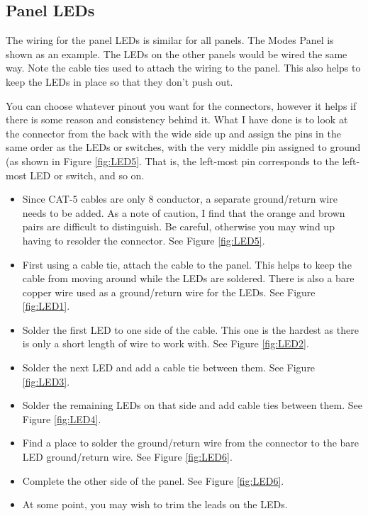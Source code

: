 \documentclass[10pt, openany]{book}
\begin{document}
\clearpage
\subsection{Panel LEDs}
\label{subsec:PanelLED}
The wiring for the panel LEDs is similar for all panels.  The Modes Panel is shown as an example.  The LEDs on the other panels would be wired the same way.  Note the cable ties used to attach the wiring to the panel.  This also helps to keep the LEDs in place so that they don't push out.

You can choose whatever pinout you want for the connectors, however it helps if there is some reason and consistency behind it.  What I have done is to look at the connector from the back with the wide side up and assign the pins in the same order as the LEDs or switches, with the very middle pin assigned to ground (as shown in Figure \ref{fig:LED5}.  That is, the left-most pin corresponds to the left-most LED or switch, and so on.

\begin{itemize}
  \item Since CAT-5 cables are only 8 conductor, a separate ground/return wire needs to be added.  As a note of caution, I find that the orange and brown pairs are difficult to distinguish.  Be careful, otherwise you may wind up having to resolder the connector.  See Figure \ref{fig:LED5}.
  \item First using a cable tie, attach the cable to the panel.  This helps to keep the cable from moving around while the LEDs are soldered.  There is also a bare copper wire used as a ground/return wire for the LEDs.  See Figure \ref{fig:LED1}.
  \item Solder the first LED to one side of the cable.  This one is the hardest as there is only a short length of wire to work with.  See Figure \ref{fig:LED2}.
  \item Solder the next LED and add a cable tie between them.  See Figure \ref{fig:LED3}.
  \item Solder the remaining LEDs on that side and add cable ties between them.  See Figure \ref{fig:LED4}.
  \item Find a place to solder the ground/return wire from the connector to the bare LED ground/return wire.  See Figure \ref{fig:LED6}.
  \item Complete the other side of the panel.  See Figure \ref{fig:LED6}.
  \item At some point, you may wish to trim the leads on the LEDs.
\end{itemize}
\end{document}
